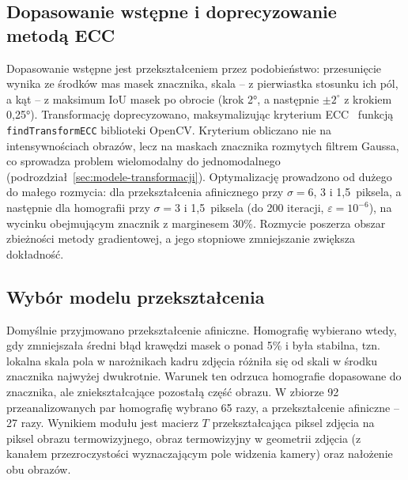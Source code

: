 \subsection{Dopasowanie wstępne i doprecyzowanie metodą ECC}

Dopasowanie wstępne jest przekształceniem przez podobieństwo: przesunięcie wynika ze środków mas masek znacznika, skala -- z pierwiastka stosunku ich pól, a kąt -- z maksimum IoU masek po obrocie (krok 2°, a następnie $\pm 2^\circ$ z krokiem 0,25°). Transformację doprecyzowano, maksymalizując kryterium ECC~\cite{evangelidis2008} funkcją \texttt{findTransformECC} biblioteki OpenCV. Kryterium obliczano nie na intensywnościach obrazów, lecz na maskach znacznika rozmytych filtrem Gaussa, co sprowadza problem wielomodalny do jednomodalnego (podrozdział~\ref{sec:modele-transformacji}). Optymalizację prowadzono od dużego do małego rozmycia: dla przekształcenia afinicznego przy $\sigma = 6$, 3 i 1,5~piksela, a następnie dla homografii przy $\sigma = 3$ i 1,5~piksela (do 200 iteracji, $\varepsilon = 10^{-6}$), na wycinku obejmującym znacznik z marginesem 30\%. Rozmycie poszerza obszar zbieżności metody gradientowej, a jego stopniowe zmniejszanie zwiększa dokładność.

\subsection{Wybór modelu przekształcenia}

Domyślnie przyjmowano przekształcenie afiniczne. Homografię wybierano wtedy, gdy zmniejszała średni błąd krawędzi masek o ponad 5\% i była stabilna, tzn. lokalna skala pola w narożnikach kadru zdjęcia różniła się od skali w środku znacznika najwyżej dwukrotnie. Warunek ten odrzuca homografie dopasowane do znacznika, ale zniekształcające pozostałą część obrazu. W zbiorze 92 przeanalizowanych par homografię wybrano 65 razy, a przekształcenie afiniczne -- 27 razy. Wynikiem modułu jest macierz $T$ przekształcająca piksel zdjęcia na piksel obrazu termowizyjnego, obraz termowizyjny w geometrii zdjęcia (z kanałem przezroczystości wyznaczającym pole widzenia kamery) oraz nałożenie obu obrazów.

